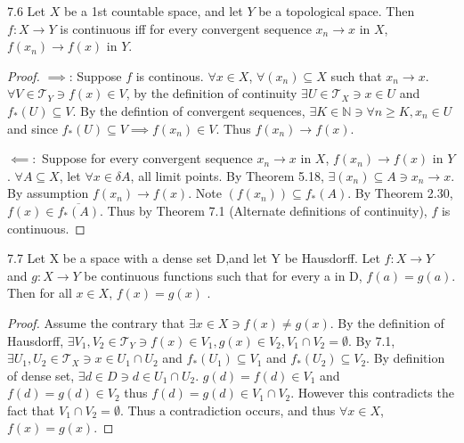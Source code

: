 \documentclass{article}
\newcommand*{\T}{\mathcal{T}}
\newcommand*{\subeq}{\subseteq}
\newcommand*{\empset}{\emptyset}
\newcommand{\N}{\mathbb{N}}
\begin{document}
\bigskip

\begin{claim}{7.6}\label{Claim 7.6.}
    Let $X$ be a 1st countable space, and let $Y$ be a topological space. Then $f: X \to Y$ is continuous iff for every convergent sequence $x_n \to x$ in $X$, $f(x_n) \to f(x)$ in $Y$.       
\end{claim}
\begin{proof}
    $\implies$: Suppose $f$ is continous. $\forall x \in X$, $\forall (x_n) \subseteq X$ such that $x_n \to x$. $\forall V \in \T_Y \ni f(x) \in V$, by the definition of continuity $\exists U \in \T_X \ni x \in U$ and $f_*(U) \subseteq V$. By the defintion of convergent sequences, $\exists K \in \N \ni \forall n \geq K, x_n \in U$ and since $f_*(U) \subseteq V \implies f(x_n) \in V$. Thus $f(x_n) \to f(x)$. 
    
    $\impliedby:$ Suppose for every convergent sequence $x_n \to x$ in $X$, $f(x_n) \to f(x)$ in $Y$. $\forall A \subseteq X$, let $\forall x \in \delta A$, all limit points. By Theorem 5.18, $\exists (x_n) \subseteq A \ni x_n \to x$. By assumption $f(x_n) \to f(x)$. Note $(f(x_n)) \subseteq f_*(A)$. By Theorem 2.30, $f(x) \in \overline{f_*(A)}$. Thus by Theorem 7.1 (Alternate definitions of continuity), $f$ is continuous.              
\end{proof}

\bigskip

\begin{claim}{7.7}\label{Claim 7.7.}
    Let X be a space with a dense set D,and let Y be Hausdorff. Let $f: X \to Y$  and $g: X \to Y$ be continuous functions such that for every a in D, $f(a) = g(a)$. Then for all $x \in X$, $f(x) = g(x)$ .
\end{claim}
\begin{proof}
    Assume the contrary that $\exists x \in X \ni f(x) \neq g(x)$. By the definition of Hausdorff, $\exists V_1, V_2 \in \T_Y \ni f(x) \in V_1, g(x) \in V_2, V_1 \cap V_2 = \empset$. By 7.1, $\exists U_1, U_2 \in \T_X \ni x \in U_1 \cap U_2$ and $f_*(U_1) \subeq V_1$ and $f_*(U_2) \subeq V_2$. By definition of dense set, $\exists d \in D \ni d \in U_1 \cap U_2$. $g(d) = f(d) \in V_1$ and $f(d) = g(d) \in V_2$ thus $f(d) = g(d) \in V_1 \cap V_2$. However this contradicts the fact that $V_1 \cap V_2 = \empset$. Thus a contradiction occurs, and thus $\forall x \in X$, $f(x) = g(x)$.                
\end{proof}

\bigskip
\end{document}
